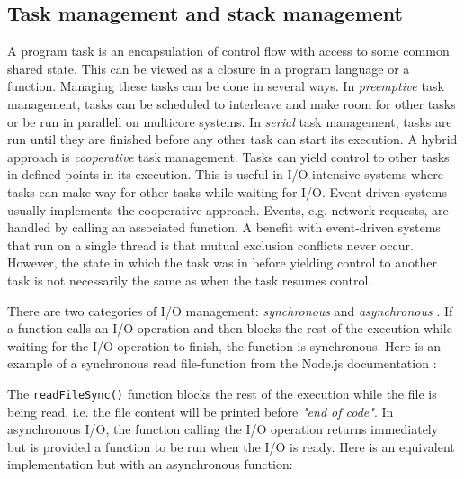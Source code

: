 
\subsection{Task management and stack management}

A program task is an encapsulation of control flow with access to some common
shared state. This can be viewed as a closure in a program language or a
function. Managing these tasks can be done in several ways. In
\textit{preemptive} task management, tasks can be scheduled to interleave and
make room for other tasks or be run in parallell on multicore systems. In
\textit{serial} task management, tasks are run until they are finished before
any other task can start its execution. A hybrid approach is
\textit{cooperative} task management. Tasks can yield control to other tasks in
defined points in its execution. This is useful in I/O intensive systems where
tasks can make way for other tasks while waiting for I/O. Event-driven systems
usually implements the cooperative approach. Events, e.g.  network requests,
are handled by calling an associated function. A benefit with event-driven
systems that run on a single thread is that mutual exclusion conflicts never
occur. However, the state in which the task was in before yielding control to
another task is not necessarily the same as when the task resumes control.
\cite{adya2002cooperative}

There are two categories of I/O management: \textit{synchronous} and
\textit{asynchronous} \cite{adya2002cooperative}. If a function calls an I/O
operation and then blocks the rest of the execution while waiting for the I/O
operation to finish, the function is synchronous. Here is an example of a
synchronous read file-function from the Node.js documentation
\cite{nodejs-docs}:



The \lstinline{readFileSync()} function blocks the rest of the execution while
the file is being read, i.e. the file content will be printed before
\textit{"end of code"}. In asynchronous I/O, the function calling the I/O
operation returns immediately but is provided a function to be run when the I/O
is ready. Here is an equivalent implementation but with an asynchronous
function:

